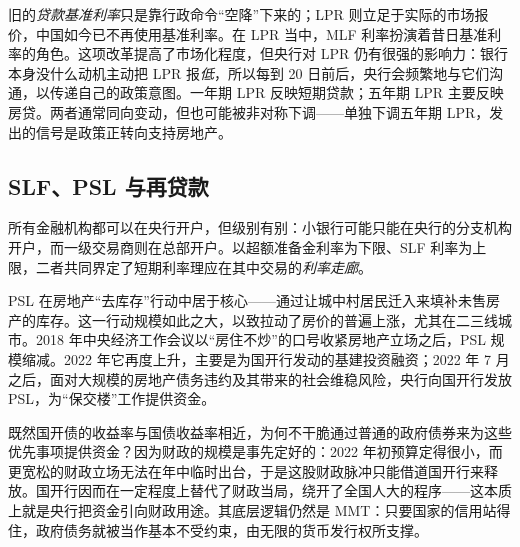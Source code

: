 \begin{remark}
旧的\emph{贷款基准利率}只是靠行政命令“空降”下来的；LPR 则立足于实际的市场报价，中国如今已不再使用基准利率。在 LPR 当中，MLF 利率扮演着昔日基准利率的角色。这项改革提高了市场化程度，但央行对 LPR 仍有很强的影响力：银行本身没什么动机主动把 LPR 报\emph{低}，所以每到 20 日前后，央行会频繁地与它们沟通，以传递自己的政策意图。一年期 LPR 反映短期贷款；五年期 LPR 主要反映房贷。两者通常同向变动，但也可能被非对称下调——单独下调五年期 LPR，发出的信号是政策正转向支持房地产。
\end{remark}

\subsection{SLF、PSL 与再贷款}


所有金融机构都可以在央行开户，但级别有别：小银行可能只能在央行的分支机构开户，而一级交易商则在总部开户。以超额准备金利率为下限、SLF 利率为上限，二者共同界定了短期利率理应在其中交易的\emph{利率走廊}。


\begin{remark}
PSL 在房地产“去库存”行动中居于核心——通过让城中村居民迁入来填补未售房产的库存。这一行动规模如此之大，以致拉动了房价的普遍上涨，尤其在二三线城市。2018 年中央经济工作会议以“房住不炒”的口号收紧房地产立场之后，PSL 规模缩减。2022 年它再度上升，主要是为国开行发动的基建投资融资；2022 年 7 月之后，面对大规模的房地产债务违约及其带来的社会维稳风险，央行向国开行发放 PSL，为“保交楼”工作提供资金。

既然国开债的收益率与国债收益率相近，为何不干脆通过普通的政府债券来为这些优先事项提供资金？因为财政的规模是事先定好的：2022 年初预算定得很小，而更宽松的财政立场无法在年中临时出台，于是这股财政脉冲只能借道国开行来释放。国开行因而在一定程度上替代了财政当局，绕开了全国人大的程序——这本质上就是央行把资金引向财政用途。其底层逻辑仍然是 MMT：只要国家的信用站得住，政府债务就被当作基本不受约束，由无限的货币发行权所支撑。
\end{remark}

